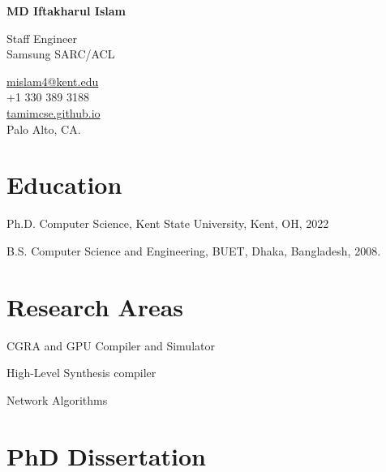 \documentclass[11pt,letterpaper]{report}
\newcommand{\myname}{MD Iftakharul Islam}
\newcommand{\namefont}[1]{{\normalfont\bfseries\Huge{#1}}}
\newcommand{\listitemspace}{0.25em}
\renewenvironment{itemize}
{\begin{list}{}{\setlength{\leftmargin}{0em}
                \setlength{\parskip}{0em}
                \setlength{\itemsep}{\listitemspace}
                \setlength{\parsep}{\listitemspace}}}
{\end{list}}
\begin{document}
    \raggedright{}

    \namefont{\myname}

    \vspace{1em}
    \begin{minipage}[t]{0.700\textwidth}
        Staff Engineer \\
        Samsung SARC/ACL
    \end{minipage}
    \begin{minipage}[t]{0.295\textwidth}
        \flushright{}
        \href{mailto:mislam4@kent.edu}{mislam4@kent.edu} \\
        +1 330 389 3188 \\
        \href{https://tamimcse.github.io/}{tamimcse.github.io} \\
        Palo Alto, CA.
    \end{minipage}


    \section*{Education}

    \begin{tablist}

        \item[Ph.D.] \tab{}Computer Science, Kent State University, Kent, OH, 2022
        \item[B.S.]  \tab{}Computer Science and Engineering, BUET, Dhaka, Bangladesh, 2008.

    \end{tablist}


    \section*{Research Areas}

    \begin{itemize}

        \item CGRA and GPU Compiler and Simulator
        \item High-Level Synthesis compiler
        \item Network Algorithms

    \end{itemize}

    \section*{PhD Dissertation}
\end{document}
